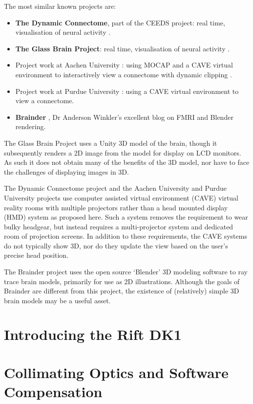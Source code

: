 \documentclass[MSc,paper=a4,pagesize=auto]{icldt}
\begin{document}
The most similar known projects are:
\begin{itemize}
  \item \textbf{The Dynamic Connectome}, part of the CEEDS project: real time, visualisation of neural activity \cite{ceeds2014}.
  \item \textbf{The Glass Brain Project}: real time, visualisation of neural activity \cite{GlassBrain2014}.
  \item Project work at Aachen University \cite{Rick2011}: using MOCAP and a CAVE virtual environment to interactively view a connectome with dynamic clipping \cite{ceeds2014}.
  \item Project work at Purdue University \cite{Chen2011}: using a CAVE virtual environment to view a connectome.
  \item \textbf{Brainder} \cite{brainder2014}, Dr Anderson Winkler’s excellent blog on FMRI and Blender rendering.
\end{itemize}


The Glass Brain Project uses a Unity 3D model of the brain, though it subsequently renders a 2D image from the model for display on LCD monitors. As such it does not obtain many of the benefits of the 3D model, nor have to face the challenges of displaying images in 3D.

The Dynamic Connectome project and the Aachen University and Purdue University projects use computer assisted virtual environment (CAVE) virtual reality rooms with multiple projectors rather than a head mounted display (HMD) system as proposed here. Such a system removes the requirement to wear bulky headgear, but instead requires a multi-projector system and dedicated room of projection screens. In addition to these requirements, the CAVE systems do not typically show 3D, nor do they update the view based on the user’s precise head position.

The Brainder project uses the open source ‘Blender’ 3D modeling software to ray trace brain models, primarily for use as 2D illustrations. Although the goals of Brainder are different from this project, the existence of (relatively) simple 3D brain models may be a useful asset. 



\section{Introducing the Rift DK1}
\section{Collimating Optics and Software Compensation}
\end{document}
